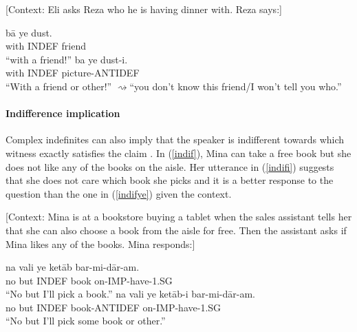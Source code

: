 \documentclass{salt}
\begin{document}
	\begin {exe}
		\ex \label {aignorance} {\footnotesize [Context: Eli asks Reza who he is having dinner with. Reza says:]}
		\begin {xlist} \ex \label{anignor}
			\gll 	b\={a}	{\color {red}ye} dust.\\
				with	{\scriptsize INDEF} friend\\
			\glt 	``with a friend!''
		\ex \label {aignore}
			\gll 	ba {\color {red}ye} dust-{\color {blue}i}.\\
				with {\scriptsize INDEF} picture-{\scriptsize ANTIDEF}\\
			\glt 	``With a friend or other!'' {\small $\rightsquigarrow$``you don't know this friend/I won't tell you who.''}
		\end {xlist}
	\end {exe}

\paragraph {Indifference implication} Complex indefinites can also imply that the speaker is indifferent towards which witness exactly satisfies the claim \citep{von2000whatever}. In (\ref{indif}), Mina can take a free book but she does not like any of the books on the aisle. Her utterance in (\ref{indifi}) suggests that she does not care which book she picks and it is a better response to the question than the one in (\ref{indifye}) given the context.

	\begin {exe}
		\ex \label {indif} {\footnotesize [Context: Mina is at a bookstore buying a tablet when the sales assistant tells her that she can also choose a book from the aisle for free. Then the assistant asks if Mina likes any of the books. Mina responds:]}
		\begin {xlist} \ex \label{indifye}
			\gll 	na vali {\color {red}ye} ket\={a}b 	bar-mi-d\={a}r-am.\\
				no but {\scriptsize INDEF} book	on-{\scriptsize IMP}-have-{\scriptsize 1.SG}\\
			\glt 	``No but I'll pick a book.''
		\ex \label {indifi}
			\gll 	na vali {\color {red}ye} ket\={a}b-{\color {blue}i} 	bar-mi-d\={a}r-am.\\
				no but {\scriptsize INDEF} book-{\scriptsize ANTIDEF}	on-{\scriptsize IMP}-have-{\scriptsize 1.SG}\\
			\glt 	``No but I'll pick some book or other.''
		\end {xlist}
	\end {exe}
\end{document}
